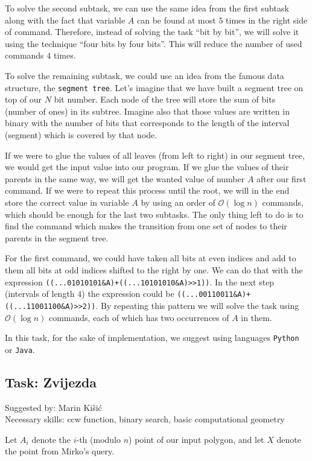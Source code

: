 \documentclass[a4paper]{article}
\begin{document}
To solve the second subtask, we can use the same idea from the first subtask
along with the fact that variable $A$ can be found at most $5$ times in the
right side of command. Therefore, instead of solving the task ``bit by bit'',
we will solve it using the technique ``four bits by four bits''. This will
reduce the number of used commands $4$ times.

To solve the remaining subtask, we could use an idea from the famous data
structure, the \texttt{segment tree}. Let's imagine that we have built a
segment tree on top of our $N$ bit number. Each node of the tree will store
the sum of bits (number of ones) in its subtree. Imagine also that those
values are written in binary with the number of bits that corresponds to
the length of the interval (segment) which is covered by that node.

If we were to glue the values of all leaves (from left to right) in our segment
tree, we would get the input value into our program. If we glue the values of
their parents in the same way, we will get the wanted value of number $A$ after
our first command. If we were to repeat this process until the root, we will in
the end store the correct value in variable $A$ by using an order of
$\mathcal{O}(\log n)$ commands, which should be enough for the last two
subtasks.  The only thing left to do is to find the command which makes the
transition from one set of nodes to their parents in the segment tree.

For the first command, we could have taken all bits at even indices and add to
them all bits at odd indices shifted to the right by one. We can do that with
the expression \verb|((...01010101&A)+((...10101010&A)>>1))|. In the next step
(intervals of length $4$) the expression could be
\verb|((...00110011&A)+((...11001100&A)>>2))|. By repeating this pattern we
will solve the task using $\mathcal{O}(\log n)$ commands, each of which has two
occurrences of $A$ in them.

In this task, for the sake of implementation, we suggest using languages
\texttt{Python} or \texttt{Java}.

\subsection*{Task: Zvijezda}
\textsf{Suggested by: Marin Kišić}\\
\textsf{Necessary skills: ccw function, binary search, basic computational
geometry}

Let $A_i$ denote the $i$-th (modulo $n$) point of our input polygon, and let
$X$ denote the point from Mirko's query.
\end{document}
